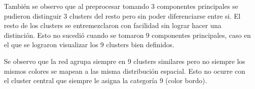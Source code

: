 También se observo que al preprocesar tomando 3 componentes principales se
pudieron distinguir 3 clusters del resto pero sin poder diferenciarse entre si.
El resto de los clusters se entremezclaron con facilidad sin lograr hacer una
distinción. Esto no sucedió cuando se tomaron 9 componentes principales, caso
en el que se lograron visualizar los 9 clusters bien definidos.

Se observo que la red agrupa siempre en 9 clusters similares pero no siempre
los mismos colores se mapean a las misma distribución espacial. Esto no ocurre
con el cluster central que siempre le asigna la categoría 9 (color bordo).

